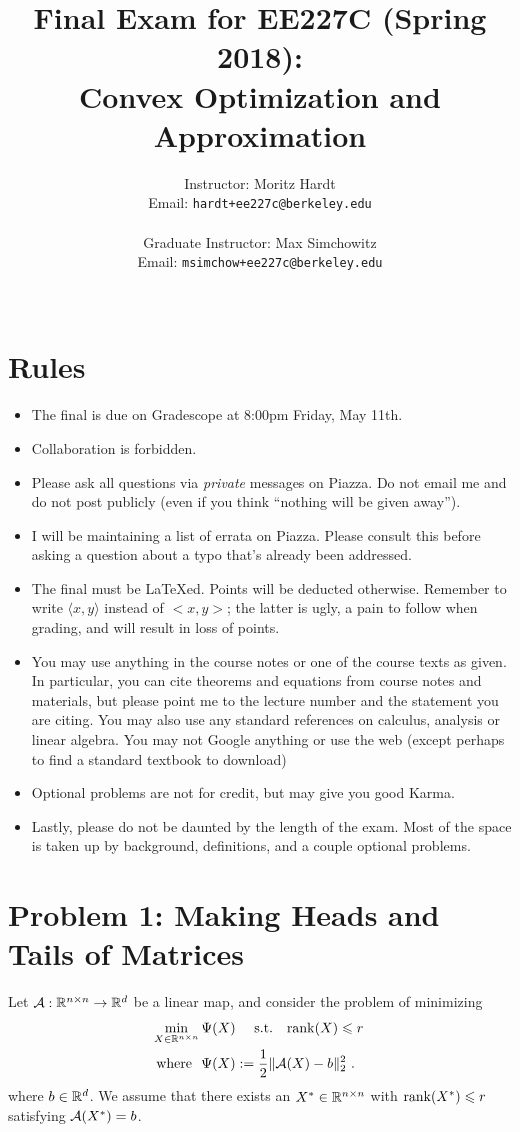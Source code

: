 \documentclass[12pt]{article}
\title{Final Exam for EE227C (Spring 2018):\\
 Convex Optimization and Approximation }
\author{Instructor: Moritz Hardt\\
{\small Email: \tt hardt+ee227c@berkeley.edu}\\ ~\\
Graduate Instructor: Max Simchowitz\\
{\small Email: \tt msimchow+ee227c@berkeley.edu}\\ ~\\
}
\begin{document}


\maketitle

\section*{Rules}
\begin{itemize}
	\item The final is due on Gradescope at 8:00pm Friday, May 11th.
	\item Collaboration is forbidden. 
	\item Please ask all questions via \emph{private} messages on Piazza. Do not email me and do not post publicly (even if you think ``nothing will be given away'').
	\item I will be maintaining a list of errata on Piazza. Please consult this before asking a question about a typo that's already been addressed.
	\item The final must be LaTeXed. Points will be deducted otherwise. Remember to write $\langle x, y \rangle$ instead of $<x,y>$; the latter is ugly, a pain to follow when grading, and will result in loss of points.
	\item You may use anything in the course notes or one of the course texts as given. In particular, you can cite theorems and equations from course notes and materials, but please point me to the lecture number and the statement you are citing. You may also use any standard references on calculus, analysis or linear algebra. You may not Google anything or use the web (except perhaps to find a standard textbook to download)
	\item Optional problems are not for credit, but may give you good Karma.
	\item Lastly, please do not be daunted by the length of the exam. Most of the space is taken up by background, definitions, and a couple optional problems. 
\end{itemize}
\newpage
\section*{Problem 1: Making Heads and Tails of Matrices}
	Let ${\cal A}: \mathbb{R}^{n \times n} \to \mathbb{R}^d$ be a linear map, and consider the problem of minimizing
	\begin{eqnarray*}
	&\min_{X \in \mathbb{R}^{n \times n}}\Psi(X)\quad~\text{s.t.}\quad \mathrm{rank}(X) \leqslant r~\\
	&\text{ where }~\Psi(X) := \frac{1}{2}\|{\cal A}(X)- b\|_{2}^2~. 
	\end{eqnarray*}
	where $b \in \mathbb{R}^d$. We assume that there exists an $X^* \in \mathbb{R}^{n \times n}$ with $\mathrm{rank}(X^*) \leqslant r$ satisfying ${\cal A}(X^*) = b$.
\end{document}
